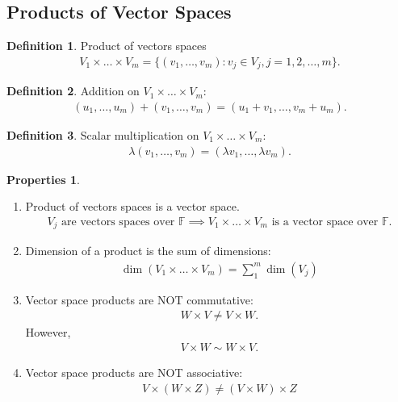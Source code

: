 \documentclass{article}
\theoremstyle{definition}
\newtheorem{defn}{Definition}[section]
\newtheorem{prop}{Properties}[section]
\newcommand{\F}{\mathbb{F}}
\begin{document}
\subsection{Products of Vector Spaces}
\begin{defn}
	Product of vectors spaces
	\begin{align*}
	V_1 \times\dots\times V_m = \{ (v_1,\dots,v_m): v_j \in V_j, j=1,2,\dots,m\}.
	\end{align*}
\end{defn}
\begin{defn}
	Addition on $V_1 \times\dots\times V_m$:
	\begin{align*}
	(u_1,\dots,u_m) + (v_1,\dots,v_m) = (u_1+v_1,\dots,v_m+u_m).
	\end{align*}
\end{defn}
\begin{defn}
	Scalar multiplication on $V_1 \times\dots\times V_m$:
	\begin{align*}
	\lambda(v_1,\dots,v_m) = (\lambda v_1,\dots,\lambda v_m).
	\end{align*}
\end{defn}
\begin{prop}
	$\,$
	\begin{enumerate}
		\item Product of vectors spaces is a vector space.
		\begin{align*}
		V_j \text{ are vectors spaces over } \F \implies V_1\times\dots\times V_m \text{ is a vector space over } \F.
		\end{align*}
		\item Dimension of a product is the sum of dimensions: 
		\begin{align*}
		\dim(V_1\times\dots\times V_m) = \sum_1^m\dim(V_j)
		\end{align*}
		\item Vector space products are NOT commutative:
		\begin{align*}
		W\times V \neq V\times W.
		\end{align*}
		However, 
		\begin{align*}
		V\times W \sim W \times V.
		\end{align*}
		\item Vector space products are NOT associative:
		\begin{align*}
		V\times(W\times Z) \neq (V\times W)\times Z
		\end{align*}
	\end{enumerate}
\end{prop}
\end{document}
